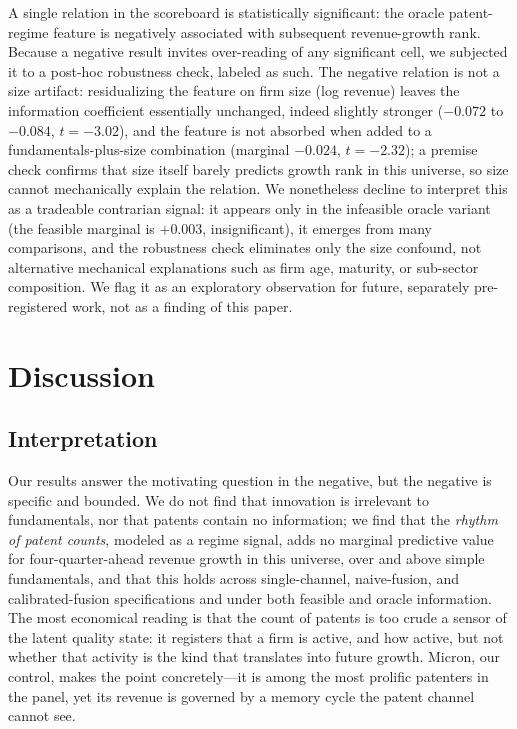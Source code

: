\documentclass[11pt]{article}
\begin{document}
A single relation in the scoreboard is statistically significant: the oracle patent-regime feature is negatively associated with subsequent revenue-growth rank. Because a negative result invites over-reading of any significant cell, we subjected it to a post-hoc robustness check, labeled as such. The negative relation is not a size artifact: residualizing the feature on firm size (log revenue) leaves the information coefficient essentially unchanged, indeed slightly stronger ($-0.072$ to $-0.084$, $t=-3.02$), and the feature is not absorbed when added to a fundamentals-plus-size combination (marginal $-0.024$, $t=-2.32$); a premise check confirms that size itself barely predicts growth rank in this universe, so size cannot mechanically explain the relation. We nonetheless decline to interpret this as a tradeable contrarian signal: it appears only in the infeasible oracle variant (the feasible marginal is $+0.003$, insignificant), it emerges from many comparisons, and the robustness check eliminates only the size confound, not alternative mechanical explanations such as firm age, maturity, or sub-sector composition. We flag it as an exploratory observation for future, separately pre-registered work, not as a finding of this paper.

\section{Discussion}

\subsection{Interpretation}

Our results answer the motivating question in the negative, but the negative is specific and bounded. We do not find that innovation is irrelevant to fundamentals, nor that patents contain no information; we find that the \emph{rhythm of patent counts}, modeled as a regime signal, adds no marginal predictive value for four-quarter-ahead revenue growth in this universe, over and above simple fundamentals, and that this holds across single-channel, naive-fusion, and calibrated-fusion specifications and under both feasible and oracle information. The most economical reading is that the count of patents is too crude a sensor of the latent quality state: it registers that a firm is active, and how active, but not whether that activity is the kind that translates into future growth. Micron, our control, makes the point concretely---it is among the most prolific patenters in the panel, yet its revenue is governed by a memory cycle the patent channel cannot see.
\end{document}
